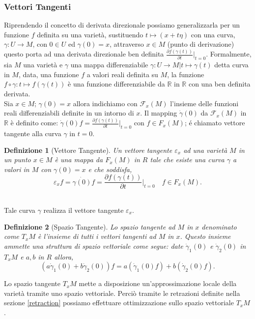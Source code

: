 \documentclass[a4paper, 12pt]{article}
\newtheorem{definition}{Definizione}
\begin{document}
\subsubsection{Vettori Tangenti}
Riprendendo il concetto di derivata direzionale possiamo generalizzarla per un funzione $f$ definita su una varietà, sustituendo $t \mapsto (x + t\eta)$ con una curva, $\gamma: U \to M$, con $0 \in U$ ed $\gamma (0) = x$, attraverso $x \in M$ (punto di derivazione) questo porta ad una derivata direzionale ben definita $\frac{\partial f(\gamma (t))}{\partial t} \vert_{t=0}$. Formalmente, sia $M$ una varietà e $\gamma$ una mappa differenziabile $\gamma : U \to M | t \mapsto \gamma (t)$ detta curva in $M$, data, una funzione $f$ a valori reali definita su $M$, la funzione $f \circ \gamma : t \mapsto f(\gamma (t))$ è una funzione differenziabile da $\mathbb{R}$ in $\mathbb{R}$ con una ben definita derivata.\\
Sia $x \in M$; $\gamma (0) = x$ allora indichiamo con $\mathcal{F}_{x}(M)$ l'insieme delle funzioni reali differenziabili definite in un intorno di $x$. Il mapping $\dot{\gamma} (0)$ da $\mathcal{F}_x(M)$ in $\mathbb{R}$ è definito come: $\dot{\gamma} (0) f = \frac{\partial f(\gamma (t))}{\partial t} \vert_{t=0}$ con $f \in F_x(M)$; é chiamato vettore tangente alla curva $\gamma$ in $t=0$.
\begin{definition}[Vettore Tangente]
Un vettore tangente $\varepsilon_x$ ad una varietà $M$ in un punto $x \in M$ è una mappa da $F_x(M)$ in $R$ tale che esiste una curva $\gamma$ a valori in $M$ con $\gamma (0) = x$ e che soddisfa,\\
\[\varepsilon_xf = \dot{\gamma (0)} f = \frac{\partial f(\gamma (t))}{\partial t} \vert_{t=0} \quad  f \in F_x(M).\]\\
\end{definition}
Tale curva $\gamma$ realizza il vettore tangente $\varepsilon_x$.
\begin{definition}[Spazio Tangente]
Lo spazio tangente ad $M$ in $x$ denominato come $T_xM$ è l'insieme di tutti i vettori tangenti ad $M$ in $x$. Questo insieme ammette una struttura di spazio vettoriale come segue: date $\dot{\gamma}_1 (0)$ e $\dot{\gamma}_2 (0)$ in $T_xM$ e $a, b$ in $R$ allora,\\
\[(a \dot{\gamma}_1 (0) + b \dot{\gamma}_2 (0)) f = a (\dot{\gamma}_1 (0) f) + b (\dot{\gamma}_2 (0) f).\]
\end{definition}
Lo spazio tangente $T_xM$ mette a disposizione un'approssimazione locale della varietà tramite uno spazio vettoriale. Perciò tramite le retrazioni definite nella sezione \ref{retraction} possiamo effettuare ottimizzazione sullo spazio vettoriale $T_xM$.
\end{document}
